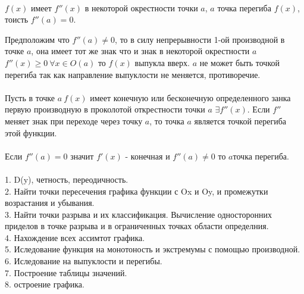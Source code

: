 \\
$f(x)$ имеет $f''(x)$ в некоторой окрестности точки $a$,  
$a$ точка перегиба $f(x)$, тоисть $f''(a) = 0$.

 Предположим что $f''(a)\not= 0$, то в
силу непрерывности 1-ой производной в точке $a$, она имеет 
тот же знак что и знак в некоторой окрестности $a$ 
$f''(x)\ge 0 ~ \forall x\in O(a)$ то $f(x)$ выпукла вверх.
$a$ не может быть точкой перегиба так как направление
выпуклости не меняется, противоречие.\\

\\
Пусть в точке $a ~ f(x)$ имеет конечную или бесконечную 
определенного занка первую производную в проколотой 
открестности точки $a$ $\exists f''(x)$. Если $f''$ меняет 
знак при переходе через точку $a$, то точка $a$ является 
точкой перегиба этой функции.\\

\\
Если $f''(a) = 0$ значит $f'(x)$ - конечная и 
$f''(a) \not= 0$ то $a$точка перегиба.\\

\\
1. D(y), четность, переодичность.\\
2. Найти точки пересечения графика функции с Ox и Oy, и
промежутки возрастания и убывания.\\
3. Найти точки разрыва и их классификация. Вычисление 
односторонних приделов в точке разрыва и в ограниченных 
точках области определния.\\
4. Нахождение всех ассимтот графика.\\
5. Иследование функция на монотоность и экстремумы с 
помощью производной.\\
6. Иследование на выпуклости и перегибы.\\
7. Построение таблицы значений.\\
8. остроение графика.\\
